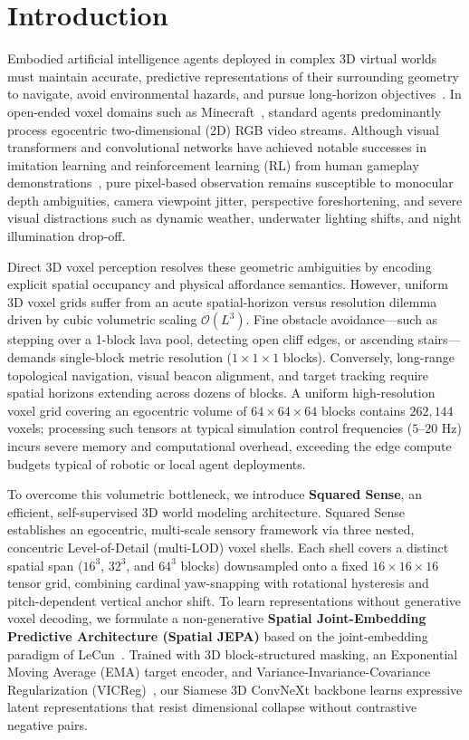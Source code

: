 \documentclass{svproc}
\begin{document}
\section{Introduction}

Embodied artificial intelligence agents deployed in complex 3D virtual worlds must maintain accurate, predictive representations of their surrounding geometry to navigate, avoid environmental hazards, and pursue long-horizon objectives~\cite{hafner2023dreamerv3,baker2022vpt}. In open-ended voxel domains such as Minecraft~\cite{guss2019minerl,fan2022minedojo}, standard agents predominantly process egocentric two-dimensional (2D) RGB video streams. Although visual transformers and convolutional networks have achieved notable successes in imitation learning and reinforcement learning (RL) from human gameplay demonstrations~\cite{baker2022vpt}, pure pixel-based observation remains susceptible to monocular depth ambiguities, camera viewpoint jitter, perspective foreshortening, and severe visual distractions such as dynamic weather, underwater lighting shifts, and night illumination drop-off. 

Direct 3D voxel perception resolves these geometric ambiguities by encoding explicit spatial occupancy and physical affordance semantics. However, uniform 3D voxel grids suffer from an acute spatial-horizon versus resolution dilemma driven by cubic volumetric scaling $\mathcal{O}(L^3)$. Fine obstacle avoidance—such as stepping over a 1-block lava pool, detecting open cliff edges, or ascending stairs—demands single-block metric resolution ($1\times1\times1$ blocks). Conversely, long-range topological navigation, visual beacon alignment, and target tracking require spatial horizons extending across dozens of blocks. A uniform high-resolution voxel grid covering an egocentric volume of $64\times64\times64$ blocks contains $262{,}144$ voxels; processing such tensors at typical simulation control frequencies ($5\text{--}20\text{ Hz}$) incurs severe memory and computational overhead, exceeding the edge compute budgets typical of robotic or local agent deployments.

To overcome this volumetric bottleneck, we introduce \textbf{Squared Sense}, an efficient, self-supervised 3D world modeling architecture. Squared Sense establishes an egocentric, multi-scale sensory framework via three nested, concentric Level-of-Detail (multi-LOD) voxel shells. Each shell covers a distinct spatial span ($16^3$, $32^3$, and $64^3$ blocks) downsampled onto a fixed $16\times16\times16$ tensor grid, combining cardinal yaw-snapping with rotational hysteresis and pitch-dependent vertical anchor shift. To learn representations without generative voxel decoding, we formulate a non-generative \textbf{Spatial Joint-Embedding Predictive Architecture (Spatial JEPA)} based on the joint-embedding paradigm of LeCun~\cite{assran2023ijepa}. Trained with 3D block-structured masking, an Exponential Moving Average (EMA) target encoder, and Variance-Invariance-Covariance Regularization (VICReg)~\cite{bardes2022vicreg}, our Siamese 3D ConvNeXt backbone learns expressive latent representations that resist dimensional collapse without contrastive negative pairs.
\end{document}
